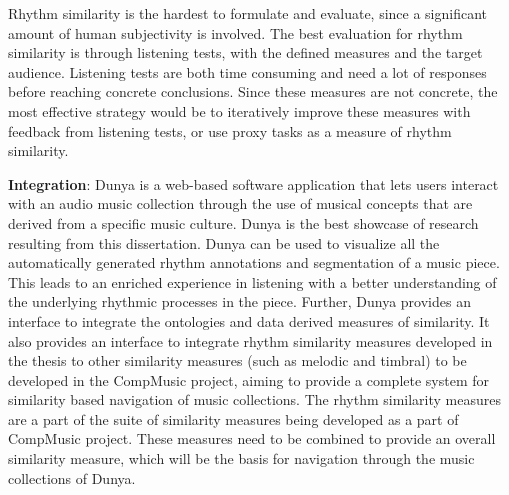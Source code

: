 Rhythm similarity is the hardest to formulate and evaluate, since a significant amount of human subjectivity is involved. The best evaluation for rhythm similarity is through listening tests, with the defined measures and the target audience. Listening tests are both time consuming and need a lot of responses before reaching concrete conclusions. Since these measures are not concrete, the most effective strategy would be to iteratively improve these measures with feedback from listening tests, or use proxy tasks as a measure of rhythm similarity. 

\textbf{Integration}: Dunya \cite{porter:13:dunya} is a web-based software application that lets users interact with an audio music collection through the use of musical concepts that are derived from a specific music culture. Dunya is the best showcase of research resulting from this dissertation. Dunya can be used to visualize all the automatically generated rhythm annotations and segmentation of a music piece. This leads to an enriched experience in listening with a better understanding of the underlying rhythmic processes in the piece. Further, Dunya provides an interface to integrate the ontologies and data derived measures of similarity. It also provides an interface to integrate rhythm similarity measures developed in the thesis to other similarity measures (such as melodic and timbral) to be developed in the CompMusic project, aiming to provide a complete system for similarity based navigation of music collections. The rhythm similarity measures are a part of the suite of similarity measures being developed as a part of CompMusic project. These measures need to be combined to provide an overall similarity measure, which will be the basis for navigation through the music collections of Dunya. 
%
